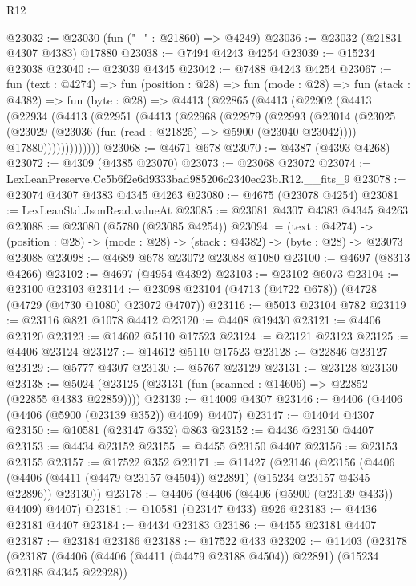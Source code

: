 \begin{lexlean}{R12}
\begin{coremodule}
@23032 := @23030 (fun ("_" : @21860) => @4249)
@23036 := @23032 (@21831 @4307 @4383) @17880
@23038 := @7494 @4243 @4254
@23039 := @15234 @23038
@23040 := @23039 @4345
@23042 := @7488 @4243 @4254
@23067 := fun (text : @4274) =>
  fun (position : @28) =>
  fun (mode : @28) =>
  fun (stack : @4382) =>
  fun (byte : @28) =>
  @4413
    (@22865
      (@4413
        (@22902
          (@4413
            (@22934
              (@4413
                (@22951
                  (@4413
                    (@22968
                      (@22979
                        (@22993
                          (@23014
                            (@23025
                              (@23029 (@23036 (fun (read : @21825) => @5900 (@23040 @23042))))
                              @17880)))))))))))))
@23068 := @4671 @678
@23070 := @4387 (@4393 @4268)
@23072 := @4309 (@4385 @23070)
@23073 := @23068 @23072
@23074 := LexLeanPreserve.Cc5b6f2e6d9333bad985206c2340ec23b.R12.__fits_9
@23078 := @23074 @4307 @4383 @4345 @4263
@23080 := @4675 (@23078 @4254)
@23081 := LexLeanStd.JsonRead.valueAt
@23085 := @23081 @4307 @4383 @4345 @4263
@23088 := @23080 (@5780 (@23085 @4254))
@23094 := (text : @4274) ->
  (position : @28) -> (mode : @28) -> (stack : @4382) -> (byte : @28) -> @23073 @23088
@23098 := @4689 @678 @23072 @23088 @1080
@23100 := @4697 (@8313 @4266)
@23102 := @4697 (@4954 @4392)
@23103 := @23102 @6073
@23104 := @23100 @23103
@23114 := @23098 @23104 (@4713 (@4722 @678)) (@4728 (@4729 (@4730 @1080) @23072 @4707))
@23116 := @5013 @23104 @782
@23119 := @23116 @821 @1078 @4412
@23120 := @4408 @19430
@23121 := @4406 @23120
@23123 := @14602 @5110 @17523
@23124 := @23121 @23123
@23125 := @4406 @23124
@23127 := @14612 @5110 @17523
@23128 := @22846 @23127
@23129 := @5777 @4307
@23130 := @5767 @23129
@23131 := @23128 @23130
@23138 := @5024 (@23125 (@23131 (fun (scanned : @14606) => @22852 (@22855 @4383 @22859))))
@23139 := @14009 @4307
@23146 := @4406 (@4406 (@4406 (@5900 (@23139 @352)) @4409) @4407)
@23147 := @14044 @4307
@23150 := @10581 (@23147 @352) @863
@23152 := @4436 @23150 @4407
@23153 := @4434 @23152
@23155 := @4455 @23150 @4407
@23156 := @23153 @23155
@23157 := @17522 @352
@23171 := @11427
    (@23146
      (@23156
        (@4406 (@4406 (@4411 (@4479 @23157 @4504)) @22891) (@15234 @23157 @4345 @22896))
        @23130))
@23178 := @4406 (@4406 (@4406 (@5900 (@23139 @433)) @4409) @4407)
@23181 := @10581 (@23147 @433) @926
@23183 := @4436 @23181 @4407
@23184 := @4434 @23183
@23186 := @4455 @23181 @4407
@23187 := @23184 @23186
@23188 := @17522 @433
@23202 := @11403
    (@23178
      (@23187
        (@4406 (@4406 (@4411 (@4479 @23188 @4504)) @22891) (@15234 @23188 @4345 @22928))

\end{coremodule}
\end{lexlean}
